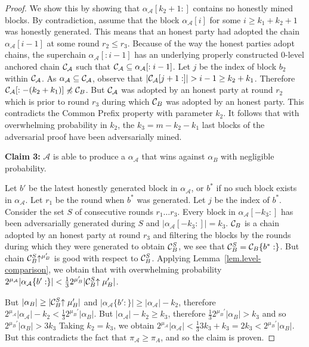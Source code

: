 \begin{proof}
    We show this by showing that $\alpha_\mathcal{A}[k_2 + 1:]$ contains
    no honestly mined blocks. By contradiction, assume that the block
    $\alpha_\mathcal{A}[i]$ for some $i \geq k_1 + k_2 + 1$ was honestly generated.
    This means that an honest party had adopted the chain
    $\alpha_\mathcal{A}[i - 1]$ at some round $r_2 \leq r_3$. Because of the
    way the honest parties adopt chains, the superchain
    $\alpha_\mathcal{A}[:i - 1]$ has an underlying properly constructed
    $0$-level anchored chain $\mathcal{C}_\mathcal{A}$ such that
    $\mathcal{C}_\mathcal{A} \subseteq \alpha_\mathcal{A}[:i - 1]$. Let $j$ be
    the index of block $b_2$ within $\mathcal{C}_\mathcal{A}$.  As
    $\alpha_\mathcal{A} \subseteq \mathcal{C}_\mathcal{A}$, observe that
    $|\mathcal{C}_\mathcal{A}[j + 1:]| > i -
    1 \geq k_2 + k_1$. Therefore $\mathcal{C}_\mathcal{A}[:-(k_2 + k_1)] \not\preccurlyeq
    \mathcal{C}_B$. But $\mathcal{C}_\mathcal{A}$ was adopted by an honest party at
    round $r_2$ which is prior to round $r_3$ during which $\mathcal{C}_B$ was
    adopted by an honest party. This contradicts the Common Prefix
    \cite{backbone} property with parameter $k_2$.
    It follows that with overwhelming probability in $k_2$, the $k_3 = m - k_2 -
    k_1$ last blocks of the adversarial proof have been adversarially mined.

    \textbf{Claim 3: } $\mathcal{A}$ is able to produce a $\alpha_\mathcal{A}$
    that wins against $\alpha_B$ with negligible probability.

    Let $b'$ be the latest honestly generated block in $\alpha_\mathcal{A}$, or
    $b^*$ if no such block exists in $\alpha_\mathcal{A}$. Let $r_1$ be the
    round when $b^*$ was generated. Let $j$ be the index of $b^*$.
    Consider the set $S$ of consecutive rounds $r_1 \ldots r_3$. Every block
    in $\alpha_\mathcal{A}[-k_3:]$ has been adversarially generated during $S$
    and $|\alpha_\mathcal{A}[-k_3:]| = k_3$. $\mathcal{C}_B$ is a chain adopted by an
    honest party at round $r_3$ and filtering the blocks by the rounds during
    which they were generated to obtain $\mathcal{C}_B^S$, we see that $\mathcal{C}_B^S =
    \mathcal{C}_B\{b^*:\}$. But chain $\mathcal{C}_B^S\negthickspace\uparrow^{\mu_B'}$ is good with
    respect to $\mathcal{C}_B^S$. Applying Lemma~\ref{lem.level-comparison}, we
    obtain that with overwhelming probability
    $2^{\mu_\mathcal{A}}|\alpha_\mathcal{A}\{b':\}| <
    \frac{1}{3}2^{\mu_B'}|\mathcal{C}_B^S\negthickspace\uparrow{\mu_B'}|$.

    But $|\alpha_B| \geq |\mathcal{C}_B^S\negthickspace\uparrow{\mu_B'}|$ and
    $|\alpha_\mathcal{A}\{b':\}| \geq |\alpha_\mathcal{A}| - k_2$, therefore
    $2^{\mu_\mathcal{A}}|\alpha_\mathcal{A}| - k_2 <
    \frac{1}{3}2^{\mu_B'}|\alpha_B|$.
    But $|\alpha_\mathcal{A}| - k_2 \geq k_3$, therefore
    $\frac{1}{3}2^{\mu_B'}|\alpha_B| > k_3$ and so $2^{\mu_B'}|\alpha_B| > 3k_3$
    Taking $k_2 = k_3$, we obtain
    $2^{\mu_\mathcal{A}}|\alpha_\mathcal{A}| <
    \frac{1}{3}3k_3 + k_3 = 2k_3 < 2^{\mu_B'}|\alpha_B|$.
    But this contradicts the fact that
    $\pi_\mathcal{A} \geq \pi_A$, and so the claim is proven.


\end{proof}
